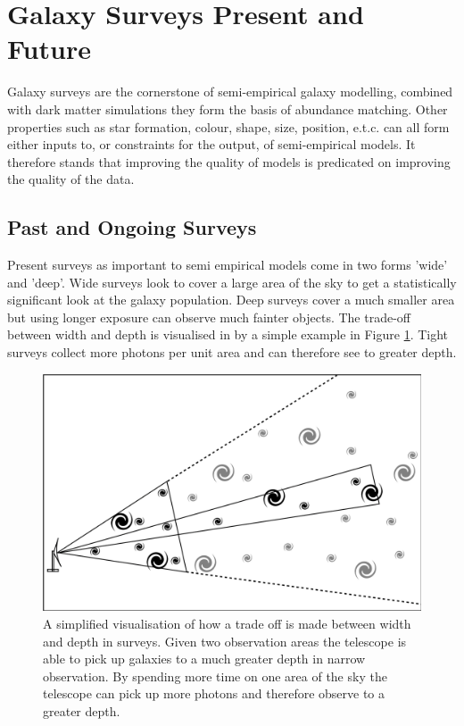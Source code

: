 \section{Galaxy Surveys Present and Future}
\label{sec:Surveys}
Galaxy surveys are the cornerstone of semi-empirical galaxy modelling, combined with dark matter simulations they form the basis of abundance matching. Other properties such as star formation, colour, shape, size, position, e.t.c. can all form either inputs to, or constraints for the output, of semi-empirical models. It therefore stands that improving the quality of models is predicated on improving the quality of the data.

\subsection{Past and Ongoing Surveys}
Present surveys as important to semi empirical models come in two forms 'wide' and 'deep'. Wide surveys look to cover a large area of the sky to get a statistically significant look at the galaxy population. Deep surveys cover a much smaller area but using longer exposure can observe much fainter objects. The trade-off between width and depth is visualised in by a simple example in Figure \ref{fig:WvD}. Tight surveys collect more photons per unit area and can therefore see to greater depth.

\begin{figure}[h]
    \centering
    \includegraphics[width = \linewidth]{Figures/Chapter1/W_v_D_Toon.png}
    \caption{A simplified visualisation of how a trade off is made between width and depth in surveys. Given two observation areas the telescope is able to pick up galaxies to a much greater depth in narrow observation. By spending more time on one area of the sky the telescope can pick up more photons and therefore observe to a greater depth.}
    \label{fig:WvD}
\end{figure}


